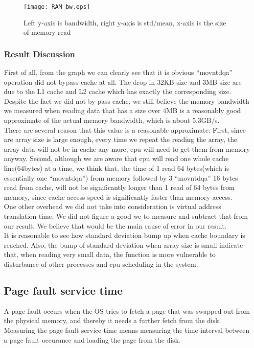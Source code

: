 \documentclass{article} %
\begin{document}
\begin{figure}[!htb]
  \centering
  \texttt{[image: RAM\_bw.eps]}
  \caption{Left y-axis is bandwidth, right y-axis is std/mean, x-axis is the size of memory read}
  \label{fig:ram_bw}
\end{figure}

\subsubsection{Result Discussion}
First of all, from the graph we can clearly see that it is obvious ``movntdqa'' operation did not bypass cache at all. The drop in 32KB size and 3MB size are due to the L1 cache and L2 cache which has exactly the corresponding size. Despite the fact we did not by pass cache, we still believe the memory bandwidth we measured when reading data that has a size over 4MB is a reasonably good approximate of the actual memory bandwidth, which is about 5.3GB/s.\\
There are several reason that this value is a reasonable approximate: First, since are array size is large enough, every time we repeat the reading the array, the array data will not be in cache any more, cpu will need to get them from memory anyway. Second, although we are aware that cpu will read one whole cache line(64bytes) at a time, we think that, the time of 1 read 64 bytes(which is essentially one ``movntdqa'') from memory followed by 3 ``movntdqa'' 16 bytes read from cache, will not be significantly longer than 1 read of 64 bytes from memory, since cache access speed is significantly faster than memory access.\\
One other overhead we did not take into consideration is virtual address translation time. We did not figure a good we to measure and subtract that from our result. We believe that would be the main cause of error in our result.\\
It is reasonable to see how standard deviation bump up when cache boundary is reached. Also, the bump of standard deviation when array size is small indicate that, when reading very small data, the function is more vulnerable to disturbance of other processes and cpu scheduling in the system.\\

\subsection{Page fault service time}
A page fault occurs when the OS tries to fetch a page that was swapped out from the physical memory, and thereby it needs a further fetch from the disk. Measuring the page fault service time means measuring the time interval between a page fault occurance and loading the page from the disk.
\end{document}
